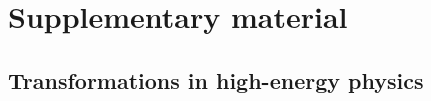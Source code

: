 \documentclass{article}
\begin{document}







% 
\printbibliography

\newpage

\appendix

\section{Supplementary material}

\subsection{\label{appendix:landscape}Transformations in high-energy physics}
\end{document}
